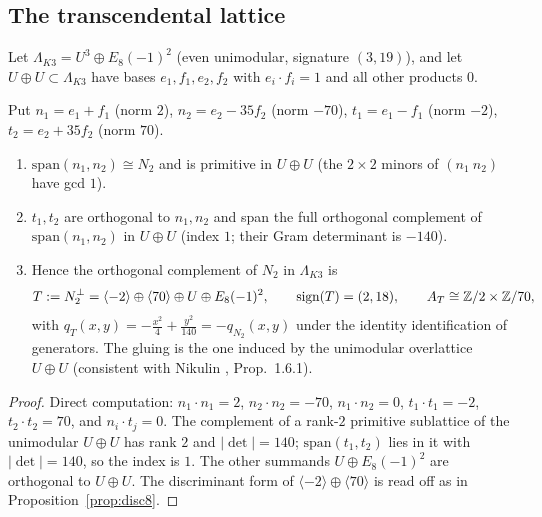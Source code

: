 \subsection{The transcendental lattice}\label{sec:rev8T}
Let $\Lambda_{K3}=U^3\oplus E_8(-1)^2$ (even unimodular, signature $(3,19)$), and let $U\oplus U\subset\Lambda_{K3}$ have bases $e_1,f_1,e_2,f_2$ with $e_i\cdot f_i=1$ and all other products $0$.
\begin{proposition}\label{prop:T8}
Put $n_1=e_1+f_1$ (norm $2$), $n_2=e_2-35f_2$ (norm $-70$), $t_1=e_1-f_1$ (norm $-2$), $t_2=e_2+35f_2$ (norm $70$).
\begin{enumerate}[label=(\roman*)]
\item $\mathrm{span}(n_1,n_2)\cong N_2$ and is primitive in $U\oplus U$ (the $2\times2$ minors of $(n_1\ n_2)$ have gcd $1$).
\item $t_1,t_2$ are orthogonal to $n_1,n_2$ and span the full orthogonal complement of $\mathrm{span}(n_1,n_2)$ in $U\oplus U$ (index $1$; their Gram determinant is $-140$).
\item Hence the orthogonal complement of $N_2$ in $\Lambda_{K3}$ is
\[
T:=N_2^\perp=\langle-2\rangle\oplus\langle70\rangle\oplus U\oplus E_8(-1)^2,\qquad\mathrm{sign}(T)=(2,18),\qquad A_T\cong\mathbb{Z}/2\times\mathbb{Z}/70,
\]
with $q_T(x,y)=-\tfrac{x^2}4+\tfrac{y^2}{140}=-q_{N_2}(x,y)$ under the identity identification of generators. The gluing is the one induced by the unimodular overlattice $U\oplus U$ (consistent with Nikulin \cite{Nikulin}, Prop.~1.6.1).
\end{enumerate}
\end{proposition}
\begin{proof}
Direct computation: $n_1\cdot n_1=2$, $n_2\cdot n_2=-70$, $n_1\cdot n_2=0$, $t_1\cdot t_1=-2$, $t_2\cdot t_2=70$, and $n_i\cdot t_j=0$. The complement of a rank-$2$ primitive sublattice of the unimodular $U\oplus U$ has rank $2$ and $|\det|=140$; $\mathrm{span}(t_1,t_2)$ lies in it with $|\det|=140$, so the index is $1$. The other summands $U\oplus E_8(-1)^2$ are orthogonal to $U\oplus U$. The discriminant form of $\langle-2\rangle\oplus\langle70\rangle$ is read off as in Proposition~\ref{prop:disc8}.
\end{proof}

